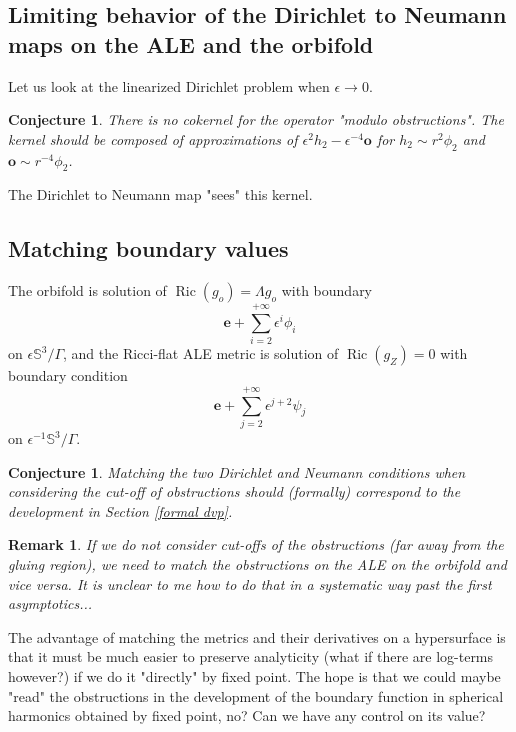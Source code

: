 \documentclass[12pt]{article}
\newtheorem{conj}[thm]{Conjecture}
\newtheorem{rem}[thm]{Remark}
\DeclareMathOperator{\Ric}{\operatorname{Ric}}
\begin{document}
   
   
   \subsection{Limiting behavior of the Dirichlet to Neumann maps on the ALE and the orbifold}
   
   Let us look at the linearized Dirichlet problem when $\epsilon\to 0$. 
   \begin{conj}
        There is no cokernel for the operator "modulo obstructions". The kernel should be composed of approximations of $ \epsilon^2 h_2 - \epsilon^{-4}\mathbf{o} $ for $h_2 \sim r^2\phi_2$ and $\mathbf{o}\sim r^{-4}\phi_2$.
   \end{conj}
   
   The Dirichlet to Neumann map "sees" this kernel.
   
   
   
   \subsection{Matching boundary values}
   
   The orbifold is solution of $\Ric(g_o) = \Lambda g_o$ with boundary $$\mathbf{e} + \sum_{i=2}^{+\infty} \epsilon^{i}\phi_i$$ on $\epsilon \mathbb{S}^3\slash\Gamma$, and the Ricci-flat ALE metric is solution of $\Ric({g_Z}) = 0$ with boundary condition $$\mathbf{e} + \sum_{j=2}^{+\infty} \epsilon^{j+2}\psi_j$$
   on $\epsilon^{-1} \mathbb{S}^3\slash\Gamma$.
   
   \begin{conj}
        Matching the two Dirichlet and Neumann conditions when considering the cut-off of obstructions should (formally) correspond to the development in Section \ref{formal dvp}.
   \end{conj}
   \begin{rem}
        If we do not consider cut-offs of the obstructions (far away from the gluing region), we need to match the obstructions on the ALE on the orbifold and vice versa. It is unclear to me how to do that in a systematic way past the first asymptotics...
   \end{rem}
    The advantage of matching the metrics and their derivatives on a hypersurface is that it must be much easier to preserve analyticity (what if there are log-terms however?) if we do it "directly" by fixed point. The hope is that we could maybe "read" the obstructions in the development of the boundary function in spherical harmonics obtained by fixed point, no? Can we have any control on its value?
   
    
\end{document}
